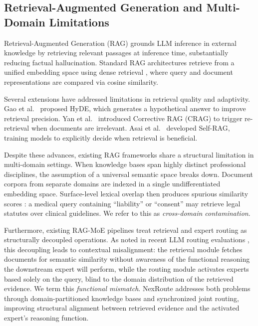 \documentclass[a4paper,fleql]{cas-sc}
\begin{document}
\subsection{Retrieval-Augmented Generation and Multi-Domain Limitations}
Retrieval-Augmented Generation (RAG) \citep{lewis2020rag} grounds LLM inference
in external knowledge by retrieving relevant passages at inference time,
substantially reducing factual hallucination. Standard RAG architectures
retrieve from a unified embedding space using dense retrieval
\citep{karpukhin2020dense}, where query and document representations are
compared via cosine similarity.

Several extensions have addressed limitations in retrieval quality and
adaptivity. Gao et al.\ \citep{gao2023hyde} proposed HyDE, which generates a
hypothetical answer to improve retrieval precision. Yan et al.\ \citep{yan2024crag}
introduced Corrective RAG (CRAG) to trigger re-retrieval when documents are
irrelevant. Asai et al.\ \citep{asai2023selfrag} developed Self-RAG, training
models to explicitly decide when retrieval is beneficial.

Despite these advances, existing RAG frameworks share a structural limitation
in multi-domain settings. When knowledge bases span highly distinct professional
disciplines, the assumption of a universal semantic space breaks down.
Document corpora from separate domains are indexed in a single undifferentiated
embedding space. Surface-level lexical overlap then produces spurious similarity
scores \citep{wang2024multilingual}: a medical query containing ``liability''
or ``consent'' may retrieve legal statutes over clinical guidelines. We refer
to this as \emph{cross-domain contamination}.

Furthermore, existing RAG-MoE pipelines \citep{jeong2024adaptiverag,dou2024loramoe}
treat retrieval and expert routing as structurally decoupled operations.
As noted in recent LLM routing evaluations \citep{hu2024routerbench}, this
decoupling leads to contextual misalignment: the retrieval module fetches
documents for semantic similarity without awareness of the functional
reasoning the downstream expert will perform, while the routing module
activates experts based solely on the query, blind to the domain distribution
of the retrieved evidence. We term this \emph{functional mismatch}.
NexRoute addresses both problems through domain-partitioned knowledge bases
and synchronized joint routing, improving structural alignment between
retrieved evidence and the activated expert's reasoning function.
\end{document}
